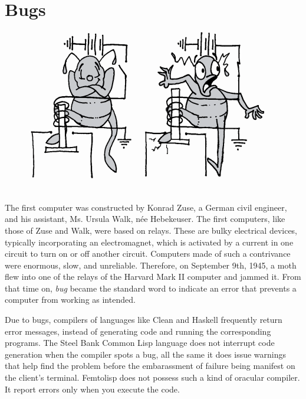 \documentclass[a4paper,12pt]{book}
\begin{document}
\section{Bugs}
\begin{figure}
\includegraphics[scale=0.5]{fig-sets/bugcerto.png}
\end{figure}
The first computer was constructed
by Konrad Zuse,
a German civil engineer, and his assistant,
Ms. Ursula Walk, née Hebekeuser.
The first computers, like those of Zuse and Walk,
were based on relays. These are
bulky electrical devices, typically incorporating
an electromagnet, which is activated by a current
in one circuit to turn on or off another circuit.
Computers made of such a contrivance were enormous,
slow, and unreliable. Therefore, on September 9th, 1945,
a moth flew into one of the relays of the Harvard  Mark II
computer and jammed it. From that time on,   {\em bug}
became the standard word to indicate
an error that prevents a computer from working as intended.

Due to bugs, compilers of languages like Clean
and Haskell frequently return error messages,
instead of generating code and running the
corresponding programs. The Steel Bank Common Lisp language
does not interrupt code generation when the
compiler spots a bug, all the same
it does issue warnings
that help find the problem before the embarassment
of failure being manifest on the client's terminal.
Femtolisp does not possess such a kind of oracular
compiler. It report errors only when you execute
the code.
\end{document}
